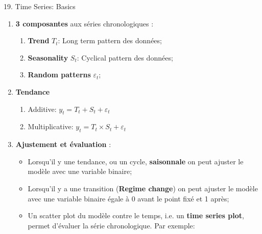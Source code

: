 \documentclass[12pt, titlepage, french]{report}
\begin{document}
\begin{CHPT_SUMM}[label = {timeseries19}]{19. Time Series: Basics}
\begin{enumerate}
\begin{itemize}
		\end{itemize}
	\item[]	\textbf{3 composantes} aux séries chronologiques :
		\begin{enumerate}
		\item	\textbf{Trend} $T_{t}$: Long term pattern des données;
		\item	\textbf{Seasonality} $S_{t}$: Cyclical pattern des données;
		\item	\textbf{Random patterns} $\varepsilon_{t}$;
		\end{enumerate}	
	\item[]	\textbf{Tendance} 
		\begin{enumerate}
			\item	Additive: 		$y_{t} = T_{t} + S_{t} + \varepsilon_{t}$
			\item	Multiplicative: 	$y_{t} = T_{t} \times S_{t} + \varepsilon_{t}$
		\end{enumerate}
	\item[]	\textbf{Ajustement et évaluation} :
		\begin{itemize}
		\item	Lorsqu'il y une tendance, ou un cycle, \textbf{saisonnale} on peut ajuster le modèle avec une variable binaire;
		\item	Lorsqu'il y a une transition (\textbf{Regime change}) on peut ajuster le modèle avec une variable binaire égale à 0 avant le point fixé et 1 après;
		\item	Un scatter plot du modèle contre le temps, i.e. un \textbf{time series plot}, permet d'évaluer la série chronologique. 
		Par exemple:
		

\end{itemize}
\end{enumerate}
\end{CHPT_SUMM}
\end{document}
